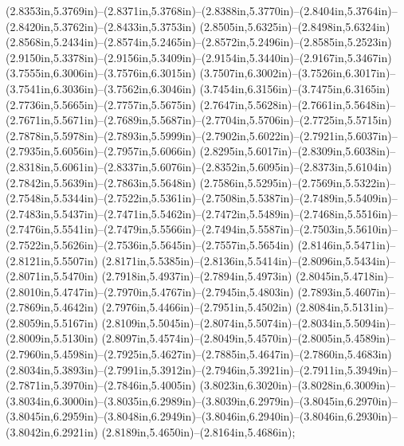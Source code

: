 (2.8353in,5.3769in)--(2.8371in,5.3768in)--(2.8388in,5.3770in)--(2.8404in,5.3764in)--(2.8420in,5.3762in)--(2.8433in,5.3753in) (2.8505in,5.6325in)--(2.8498in,5.6324in) (2.8568in,5.2434in)--(2.8574in,5.2465in)--(2.8572in,5.2496in)--(2.8585in,5.2523in) (2.9150in,5.3378in)--(2.9156in,5.3409in)--(2.9154in,5.3440in)--(2.9167in,5.3467in) (3.7555in,6.3006in)--(3.7576in,6.3015in) (3.7507in,6.3002in)--(3.7526in,6.3017in)--(3.7541in,6.3036in)--(3.7562in,6.3046in) (3.7454in,6.3156in)--(3.7475in,6.3165in) (2.7736in,5.5665in)--(2.7757in,5.5675in) (2.7647in,5.5628in)--(2.7661in,5.5648in)--(2.7671in,5.5671in)--(2.7689in,5.5687in)--(2.7704in,5.5706in)--(2.7725in,5.5715in) (2.7878in,5.5978in)--(2.7893in,5.5999in)--(2.7902in,5.6022in)--(2.7921in,5.6037in)--(2.7935in,5.6056in)--(2.7957in,5.6066in) (2.8295in,5.6017in)--(2.8309in,5.6038in)--(2.8318in,5.6061in)--(2.8337in,5.6076in)--(2.8352in,5.6095in)--(2.8373in,5.6104in) (2.7842in,5.5639in)--(2.7863in,5.5648in) (2.7586in,5.5295in)--(2.7569in,5.5322in)--(2.7548in,5.5344in)--(2.7522in,5.5361in)--(2.7508in,5.5387in)--(2.7489in,5.5409in)--(2.7483in,5.5437in)--(2.7471in,5.5462in)--(2.7472in,5.5489in)--(2.7468in,5.5516in)--(2.7476in,5.5541in)--(2.7479in,5.5566in)--(2.7494in,5.5587in)--(2.7503in,5.5610in)--(2.7522in,5.5626in)--(2.7536in,5.5645in)--(2.7557in,5.5654in) (2.8146in,5.5471in)--(2.8121in,5.5507in) (2.8171in,5.5385in)--(2.8136in,5.5414in)--(2.8096in,5.5434in)--(2.8071in,5.5470in) (2.7918in,5.4937in)--(2.7894in,5.4973in) (2.8045in,5.4718in)--(2.8010in,5.4747in)--(2.7970in,5.4767in)--(2.7945in,5.4803in) (2.7893in,5.4607in)--(2.7869in,5.4642in) (2.7976in,5.4466in)--(2.7951in,5.4502in) (2.8084in,5.5131in)--(2.8059in,5.5167in) (2.8109in,5.5045in)--(2.8074in,5.5074in)--(2.8034in,5.5094in)--(2.8009in,5.5130in) (2.8097in,5.4574in)--(2.8049in,5.4570in)--(2.8005in,5.4589in)--(2.7960in,5.4598in)--(2.7925in,5.4627in)--(2.7885in,5.4647in)--(2.7860in,5.4683in) (2.8034in,5.3893in)--(2.7991in,5.3912in)--(2.7946in,5.3921in)--(2.7911in,5.3949in)--(2.7871in,5.3970in)--(2.7846in,5.4005in) (3.8023in,6.3020in)--(3.8028in,6.3009in)--(3.8034in,6.3000in)--(3.8035in,6.2989in)--(3.8039in,6.2979in)--(3.8045in,6.2970in)--(3.8045in,6.2959in)--(3.8048in,6.2949in)--(3.8046in,6.2940in)--(3.8046in,6.2930in)--(3.8042in,6.2921in) (2.8189in,5.4650in)--(2.8164in,5.4686in);
